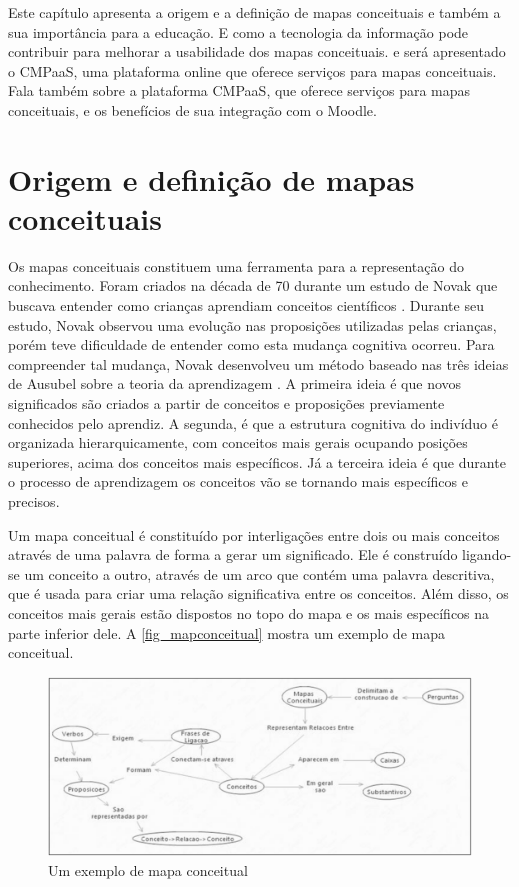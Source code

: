 \documentclass[
	12pt,				%
	openright,			%
	oneside,			%
	a4paper,			%
	english,			%
	french,				%
	spanish,			%
	brazil				%
	]{abntex2}
\begin{document}
Este capítulo apresenta a origem e a definição de mapas conceituais e também a sua importância para a educação. E como a tecnologia da informação pode contribuir para melhorar a usabilidade dos mapas conceituais. e será apresentado o CMPaaS, uma plataforma online que oferece serviços para mapas conceituais. Fala também sobre a plataforma CMPaaS, que oferece serviços para mapas conceituais, e os benefícios de sua integração com o Moodle.


\section{Origem e definição de mapas conceituais}
Os mapas conceituais constituem uma ferramenta para a representação do conhecimento. Foram criados na década de 70 durante um estudo de Novak que buscava entender como crianças aprendiam conceitos científicos \cite{Novak2005}. Durante seu estudo, Novak observou uma evolução nas proposições utilizadas pelas crianças, porém teve dificuldade de entender como esta mudança cognitiva ocorreu. Para compreender tal mudança, Novak desenvolveu um método baseado nas três ideias de Ausubel sobre a teoria da aprendizagem \cite{ausubel1963}. A primeira ideia é que novos significados são criados a partir de conceitos e proposições previamente conhecidos pelo aprendiz. A segunda, é que a estrutura cognitiva do indivíduo é organizada hierarquicamente, com conceitos mais gerais ocupando posições superiores, acima dos conceitos mais específicos. Já a terceira ideia é que durante o processo de aprendizagem os conceitos vão se tornando mais específicos e precisos.

Um mapa conceitual é constituído por interligações entre dois ou mais conceitos através de uma palavra de forma a gerar um significado. Ele é construído ligando-se um conceito a outro, através de um arco que contém uma palavra descritiva, que é usada para criar uma relação significativa entre os conceitos. Além disso, os conceitos mais gerais estão dispostos no topo do mapa e os mais específicos na parte inferior dele. A \autoref{fig_mapconceitual} mostra um exemplo de mapa conceitual.
\begin{figure}[htb]
	\caption{\label{fig_mapconceitual}Um exemplo de mapa conceitual}
	\begin{center}
		\includegraphics[scale=0.3]{mapaconceitual.png}
	\end{center}
\end{figure}
\end{document}
